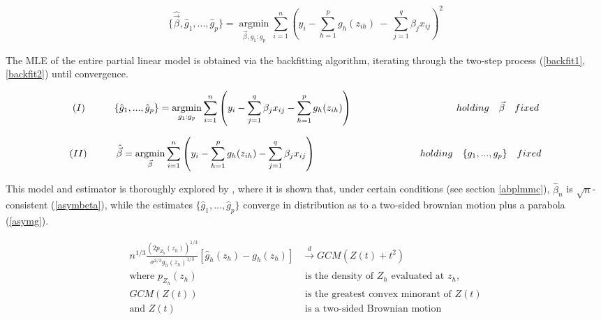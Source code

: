 \documentclass[10pt]{olplainarticle}\usepackage[]{graphicx}\usepackage[]{color}
\begin{document}
\begin{equation} \label{partlinloss}
  \{\hat{\vec\beta}, \hat{g}_1,...,\hat{g}_p\} = \underset{\vec{\beta}, g_1:g_p}{\operatorname{argmin}} \sum_{i=1}^{n} (y_i - \sum_{h=1}^{p} g_{h} (z_{ih}) \ -\  \sum_{j=1}^{q} \beta_{j} x_{ij})^2
\end{equation}


The MLE of the entire partial linear model is obtained via the backfitting algorithm, iterating through the two-step process (\ref{backfit1}, \ref{backfit2}) until convergence.

\begin{equation} \label{backfit1}
  (I) \ \ \ \ \ \ \ \ \ \{\hat{g}_1,...,\hat{g}_p\} = \underset{g_1:g_p}{\operatorname{argmin}} \sum_{i=1}^n\left(y_i-\sum_{j=1}^{q} \beta_{j} x_{ij}-\sum_{h=1}^{p} g_{h} (z_{ih})\right) \\
  \ \ \ \ \ \ \ \ \ \ \ \ \ \ \ \ \ \ \ \ \ \ \ \ \ \ \ \ \ \ \ \  holding \ \ \ \vec\beta \ \ \ fixed
\end{equation}


\begin{equation} \label{backfit2}
  (II) \ \ \ \ \ \ \ \ \ \hat{\vec{\beta}} = \underset{\vec{\beta}}{\operatorname{argmin}} \sum_{i=1}^n\left(y_i-\sum_{h=1}^{p} g_{h} (z_{ih}) - \sum_{j=1}^{q} \beta_{j} x_{ij}\right) \\
  \ \ \ \ \ \ \ \ \ \ \ \ \ \ \ \ \ \ \ \ \ \ \ \ \ \ \ \ \ \ \ \  holding \ \ \ \{g_1,...,g_p\} \ \ \ fixed
\end{equation}

This model and estimator is thoroughly explored by \cite{guangcheng}, where it is shown that, under certain conditions (see section \ref{abplmmc}), $\hat{\beta}_n$ is $\sqrt{n}$-consistent (\ref{asymbeta}), while the estimates $\{\hat{g}_1,...,\hat{g}_p\}$ converge in distribution as to a two-sided brownian motion plus a parabola (\ref{asymg}). 

\begin{equation} \label{asymg}
\begin{aligned}
  n^{1/3}\frac{(2p_{Z_h}(z_h))^{1/3}}{\sigma^{2/3}g_h(z_h)^{1/3}}[\hat{g}_h(z_h) - g_h(z_h)] &\xrightarrow{d} GCM(Z(t) + t^2) \\ 
  \text{where } p_{Z_h}(z_h) &\text{ is the density of $Z_h$ evaluated at $z_h$,} \\
  GCM(Z(t)) &\text{ is the greatest convex minorant of } Z(t) \\
  \text{and } Z(t) &\text{ is a two-sided Brownian motion} 
\end{aligned}
\end{equation}
\end{document}

